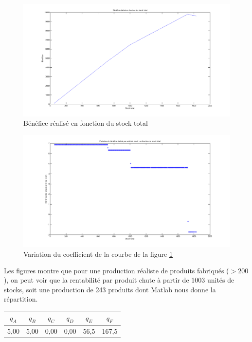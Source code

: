 \documentclass[paper=a4, fontsize=11pt]{report}
\numberwithin{equation}{section}		%
\numberwithin{figure}{section}			%
\numberwithin{table}{section}				%
\begin{document}
\begin{figure}[H]
\caption{Bénéfice réalisé en fonction du stock total \label{figben}}
\centering
\includegraphics[width=16cm]{figures/BenefFctStockTotal.png}
\end{figure}

\begin{figure}[H]
\caption{Variation du coefficient de la courbe de la figure \ref{figben}}
\centering
\includegraphics[width=16cm]{figures/BenefFctStockTotal_Coeff.png}
\end{figure}


Les figures montre que pour une production réaliste de produits fabriqués ($> 200$), on peut voir que la rentabilité par produit chute à partir de 1003 unités de stocks, soit une production de 243 produits dont Matlab nous donne la répartition.

\begin{center}
\begin{tabular}{cccccc}
\hline 
$q_A$ & $q_B$ & $q_C$ & $q_D$ & $q_E$ & $q_F$ \\ 
\hline 
5,00 & 5,00 & 0,00 & 0,00 & 56,5 & 167,5 \\ 
\hline 
\end{tabular} 
\end{center}
\end{document}
